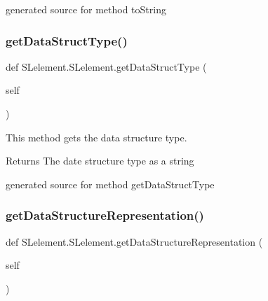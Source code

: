 \begin{DoxyVerb}generated source for method toString \end{DoxyVerb}
 \hypertarget{class_s_lelement_1_1_s_lelement_a690bf89d74bf33c3f1e612fb755bc4b5}{}\label{class_s_lelement_1_1_s_lelement_a690bf89d74bf33c3f1e612fb755bc4b5} 
\subsubsection{\texorpdfstring{get\+Data\+Struct\+Type()}{getDataStructType()}}
{\footnotesize\ttfamily def S\+Lelement.\+S\+Lelement.\+get\+Data\+Struct\+Type (\begin{DoxyParamCaption}\item[{}]{self }\end{DoxyParamCaption})}



This method gets the data structure type. 

\begin{DoxyReturn}{Returns}
The date structure type as a string\begin{DoxyVerb}generated source for method getDataStructType \end{DoxyVerb}
 
\end{DoxyReturn}
\hypertarget{class_s_lelement_1_1_s_lelement_a16059f50cdc8f93201984418042b70b5}{}\label{class_s_lelement_1_1_s_lelement_a16059f50cdc8f93201984418042b70b5} 
\subsubsection{\texorpdfstring{get\+Data\+Structure\+Representation()}{getDataStructureRepresentation()}}
{\footnotesize\ttfamily def S\+Lelement.\+S\+Lelement.\+get\+Data\+Structure\+Representation (\begin{DoxyParamCaption}\item[{}]{self }\end{DoxyParamCaption})}



